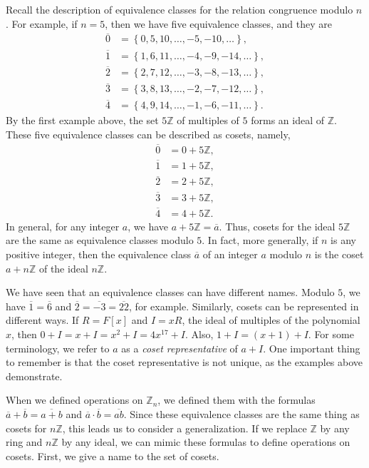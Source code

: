 Recall the description of equivalence classes for the relation congruence
modulo $n$. For example, if $n=5$, then we have five equivalence classes, and
they are
\begin{align*}
\overline{0}  &  =\left\{  0,5,10,\ldots,-5,-10,\ldots\right\}  ,\\
\overline{1}  &  =\left\{  1,6,11,\ldots,-4,-9,-14,\ldots\right\}  ,\\
\overline{2}  &  =\left\{  2,7,12,\ldots,-3,-8,-13,\ldots\right\}  ,\\
\overline{3}  &  =\left\{  3,8,13,\ldots,-2,-7,-12,\ldots\right\}  ,\\
\overline{4}  &  =\left\{  4,9,14,\ldots,-1,-6,-11,\ldots\right\}  .
\end{align*}
By the first example above, the set $5\mathbb{Z}$ of multiples of $5$ forms an
ideal of $\mathbb{Z}$. These five equivalence classes can be described as
cosets, namely,
\begin{align*}
\overline{0}  &  =0+5\mathbb{Z},\\
\overline{1}  &  =1+5\mathbb{Z},\\
\overline{2}  &  =2+5\mathbb{Z},\\
\overline{3}  &  =3+5\mathbb{Z},\\
\overline{4}  &  =4+5\mathbb{Z}.
\end{align*}
In general, for any integer $a$, we have $a+5\mathbb{Z}=\overline{a}$. Thus,
cosets for the ideal $5\mathbb{Z}$ are the same as equivalence classes modulo
$5 $. In fact, more generally, if $n$ is any positive integer, then the
equivalence class $\overline{a}$ of an integer $a$ modulo $n$ is the coset
$a+n\mathbb{Z}$ of the ideal $n\mathbb{Z}$.

We have seen that an equivalence classes can have different names. Modulo $5$,
we have $\overline{1}=\overline{6}$ and $\overline{2}=\overline{-3}%
=\overline{22}$, for example. Similarly, cosets can be represented in
different ways. If $R=F[x]$ and $I=xR$, the ideal of multiples of the
polynomial $x$, then $0+I=x+I=x^{2}+I=4x^{17}+I$. Also, $1+I=(x+1)+I$. For
some terminology, we refer to $a$ as a
%
\emph{coset representative} of $a+I$. One important thing to remember is that
the coset representative is not unique, as the examples above demonstrate.

When we defined operations on $\mathbb{Z}_{n}$, we defined them with the
formulas $\overline{a}+\overline{b}=\overline{a+b}$ and $\overline{a}%
\cdot\overline{b}=\overline{ab}$. Since these equivalence classes are the same
thing as cosets for $n\mathbb{Z}$, this leads us to consider a generalization.
If we replace $\mathbb{Z}$ by any ring and $n\mathbb{Z}$ by any ideal, we can
mimic these formulas to define operations on cosets. First, we give a name to
the set of cosets.

